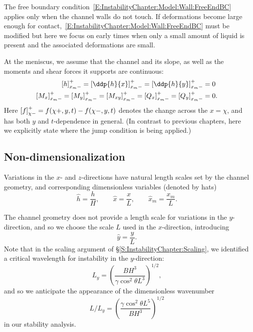 The free boundary condition~\eqref{E:InstabilityChapter:Model:Wall:FreeEndBC} applies only when the channel walls do not touch. If deformations become large enough for contact,~\eqref{E:InstabilityChapter:Model:Wall:FreeEndBC} must be modified but here we focus on early times when only a small amount of liquid is present and the associated deformations are small.

At the meniscus, we assume that the channel and its slope, as well as the moments and shear forces it supports are continuous:
\begin{align}\label{E:InstabilityChapter:Model:Wall:ContinuityBC}
\left[ h \right]\jump{x_m}  =  \left[\ddp{h}{x} \right]\jump{x_m} = \left[\ddp{h}{y} \right]\jump{x_m} &=0 \\ \left[M_x \right]\jump{x_m} =   \left[M_y \right]\jump{x_m} =  \left[M_{xy} \right]\jump{x_m} =  \left[Q_x \right]\jump{x_m} =  \left[Q_y \right]\jump{x_m} &=0.
\end{align}
Here $\left[ f \right]_{\chi-}^{+} = f(\chi+,y,t) - f(\chi-,y,t)$ denotes the change across the $x = \chi$, and has both $y$ and $t$-dependence in general. (In contrast to previous chapters, here we explicitly state where the jump condition is being applied.)

\subsection{Non-dimensionalization}\label{S:InstabilityChapter:Modelling:NonDim}
Variations in the $x$- and $z$-directions have natural length scales set by the channel geometry, and corresponding dimensionless variables (denoted by hats)
\begin{equation}\label{E:InstabilityChapter:Modelling:NonDim:SpatialScaling}
\hat{h} = \frac{h}{H}, \qquad \hat{x} = \frac{x}{L}, \qquad \hat{x}_m = \frac{x_m}{L}.
\end{equation}

The channel geometry does not provide a length scale for variations in the $y$-direction, and so we choose the scale $L$ used in the $x$-direction, introducing
\begin{equation}\label{E:InstabilityChapter:Modelling:NonDim:yscaling}
\hat{y} = \frac{y}{L}.
\end{equation}
Note that in the scaling argument of \S\ref{S:InstabilityChapter:Scaling}, we identified a critical wavelength for instability in the $y$-direction:
\begin{equation}\label{E:InstabilityChapter:Modelling:NonDim:LengthscaleFromScaling}
L_y = \left(\frac{B H^3}{\gamma  \cos^2 \theta L^3}\right)^{1/2},
\end{equation}
and so we anticipate the appearance of the dimensionless wavenumber
\begin{equation}\label{E:InstabilityChapter:Modelling:NonDim:ExpectedWavenumber}
L/L_y =  \left(\frac{\gamma \cos^2 \theta L^5}{B H^3}\right)^{1/2}
\end{equation}
in our stability analysis.

